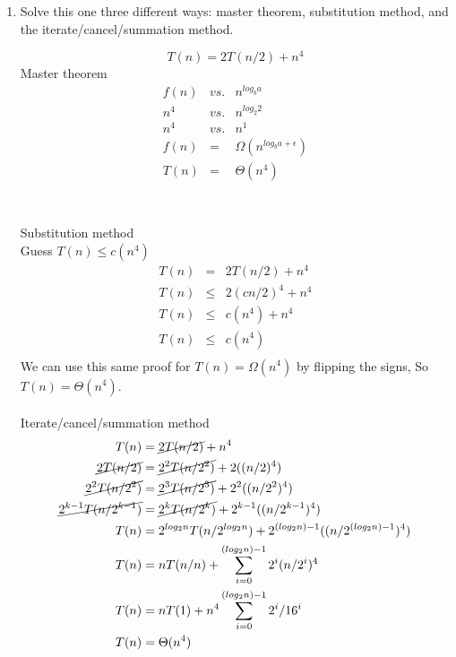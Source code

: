 \documentclass{article}
\begin{document}
    \begin{enumerate}
    \item
    
      Solve this one three different ways:  master theorem,
      substitution method, and the iterate/cancel/summation method.
    
      \[T(n) = 2T(n/2) + n^4\]
      Master theorem \\
      \begin{eqnarray*}
      f(n) &vs.& n^{log_b a} \\
      n^4 &vs.& n^{log_2 2} \\
      n^4 &vs.& n^1 \\
      f(n) &=& \Omega(n^{log_b a+\epsilon}) \\
      T(n) &=& \Theta(n^4) \\
      \end{eqnarray*}
      \\
      \\
      Substitution method \\
      Guess $T(n) \leq c(n^4)$ \\
      \begin{eqnarray*}
      T(n) &=& 2T(n/2) + n^4 \\
      T(n) &\leq& 2(cn/2)^4 + n^4 \\      
      T(n) &\leq& c(n^4) + n^4 \\
      T(n) &\leq& c(n^4) \\
      \end{eqnarray*}
      We can use this same proof for $T(n) = \Omega(n^4)$ by flipping the signs, So $T(n) = \Theta(n^4)$.
\\
\\
      Iterate/cancel/summation method \\

      \begin{align*}
      T(n) &=  \cancel{2T(n/2)} + n^4 \\
      \cancel{2T(n/2)} &=  \cancel{2^2T(n/2^2)} + 2((n/2)^4) \\
      \cancel{2^2T(n/2^2)} &=  \cancel{2^3T(n/2^3)} + 2^2((n/2^2)^4) \\
      \cancel{2^{k-1}T(n/2^{k-1})} &=  \cancel{2^kT(n/2^k)} + 2^{k-1}((n/2^{k-1})^4) \\
      T(n) &= 2^{log_2 n} T(n/2^{log_2 n}) + 2^{(log_2 n) -1}((n/2^{{(log_2 n) -1}})^4) \\
      T(n) &= n T(n/n) + \sum_{i=0}^{(log_2 n)-1}  2^i(n/2^i)^4 \\
      T(n) &= n T(1) + n^4 \sum_{i=0}^{(log_2 n)-1}  2^i/16^i \\
      T(n) &= \Theta( n^4) \\
      \end{align*}
      

\end{enumerate}
\end{document}

